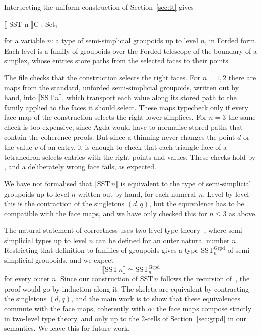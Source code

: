\documentclass[11pt]{article}
\newcommand{\ag}[1]{\texttt{\detokenize{#1}}}
\newcommand{\repourl}{https://github.com/txa/sst-new}
\newcommand{\agfile}[1]{\href{\repourl/blob/main/#1}{\ag{#1}}}
\begin{document}
Interpreting the uniform construction of Section~\ref{sec:tt} gives
\begin{agda}
⟦ SST n ⟧C : Set₁
\end{agda}
for a variable $n$: a type of semi-simplicial groupoids up to level $n$, in
Forded form. Each level is a family of groupoids over the Forded telescope
of the boundary of a simplex, whose entries store paths from the selected
faces to their points.

The file \agfile{experiments/sem1/SemSST.agda} checks that the
construction selects the right faces. For $n = 1, 2$ there are maps from
the standard, unforded semi-simplicial groupoids, written out by hand, into
$\llbracket\mathrm{SST}\,n\rrbracket$, which transport each value along its
stored path to the family applied to the faces it should select. These maps
typecheck only if every face map of the construction selects the right lower
simplices. For $n = 3$ the same check is too expensive, since Agda would have to
normalise stored paths that contain the coherence proofs. But since a
thinning never changes the point $d$ or the value $v$ of an entry, it is
enough to check that each triangle face of a tetrahedron selects entries with
the right points and values. These checks hold by \ag{refl}, and a
deliberately wrong face fails, as expected.

We have not formalised that $\llbracket\mathrm{SST}\,n\rrbracket$ is
equivalent to the type of semi-simplicial groupoids up to level $n$ written
out by hand, for each numeral $n$. Level by level this is the contraction of
the singletons $(d, q)$, but the equivalence has to be compatible with the
face maps, and we have only checked this for $n \le 3$ as above.

The natural statement of correctness uses two-level type
theory~\cite{ack-strict,acks-2ltt}, where semi-simplicial types up to level
$n$ can be defined for an outer natural number $n$. Restricting that
definition to families of groupoids gives a type
$\mathrm{SST}^{\mathrm{Grpd}}_n$ of semi-simplicial groupoids, and we expect
\[
\llbracket\mathrm{SST}\,n\rrbracket \simeq \mathrm{SST}^{\mathrm{Grpd}}_n
\]
for every outer $n$. Since our construction of $\mathrm{SST}\,n$ follows the
recursion of~\cite[Section~3]{ack-strict}, the proof would go by induction
along it. The skeleta are equivalent by contracting the singletons $(d,q)$,
and the main work is to show that these equivalences commute with the face
maps, coherently with $\alpha$: the face maps compose strictly in two-level
type theory, and only up to the 2-cells of Section~\ref{sec:grpd} in our
semantics. We leave this for future work.
\end{document}
